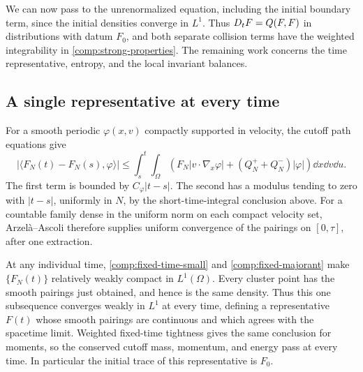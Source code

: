 We can now pass to the unrenormalized equation, including the initial
boundary term, since the initial densities converge in $L^1$.
Thus $D_t F=Q(F,F)$ in distributions with datum $F_0$, and both
separate collision terms have the weighted integrability in
\eqref{comp:strong-properties}. The remaining work concerns the time
representative, entropy, and the local invariant balances.

\subsection{A single representative at every time}

For a smooth periodic $\varphi(x,v)$ compactly supported in velocity,
the cutoff path equations give
\[
 \big|\langle F_N(t)-F_N(s),\varphi\rangle\big|
 \le\int_s^t\!\int_\Omega
 \left(F_N|v\cdot\nabla_x\varphi|
       +(Q_N^++Q_N^-)|\varphi|\right)\dd x\dd v\dd u.
\]
The first term is bounded by $C_\varphi|t-s|$.
The second has a modulus tending to zero with $|t-s|$, uniformly in
$N$, by the short-time-integral conclusion above.
For a countable family dense in the uniform norm on each compact
velocity set, Arzel\`a--Ascoli therefore supplies uniform convergence
of the pairings on $[0,\tau]$, after one extraction.

At any individual time, \eqref{comp:fixed-time-small} and
\eqref{comp:fixed-majorant} make $\{F_N(t)\}$ relatively weakly
compact in $L^1(\Omega)$. Every cluster point has the smooth pairings
just obtained, and hence is the same density. Thus this one subsequence
converges weakly in $L^1$ at every time, defining a representative
$F(t)$ whose smooth pairings are continuous and which agrees with the
spacetime limit. Weighted fixed-time tightness gives the same conclusion
for moments, so the conserved cutoff mass, momentum, and energy pass
at every time. In particular the initial trace of this representative
is $F_0$.

